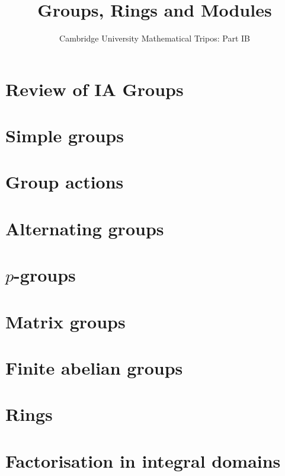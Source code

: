 \documentclass{article}
\title{Groups, Rings and Modules}
\author{Cambridge University Mathematical Tripos: Part IB}
\begin{document}
\maketitle

\tableofcontentsnewpage{}

\section{Review of IA Groups}

\section{Simple groups}

\section{Group actions}

\section{Alternating groups}

\section{\( p \)-groups}

\section{Matrix groups}

\section{Finite abelian groups}

\section{Rings}

\section{Factorisation in integral domains}

\end{document}
